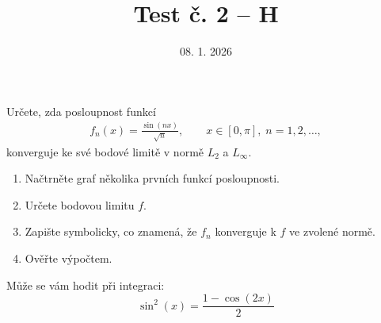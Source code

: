 \documentclass{article}
\begin{document}
\title{Test č. 2 -- H}
\date{08. 1. 2026}
\author{}
\maketitle


\noindent
Určete, zda posloupnost funkcí
\begin{align*}
        f_n(x) = \frac{\sin(nx)}{\sqrt{n}}, \qquad x\in[0,\pi],\; n=1,2,\ldots,
\end{align*}
konverguje ke své bodové limitě v normě $L_2$ a $L_\infty$.

\vspace{2cm}

\begin{enumerate}
\item Načtrněte graf několika prvních funkcí posloupnosti.
\item Určete bodovou limitu $f$.
\item Zapište symbolicky, co znamená, že $f_n$ konverguje k $f$ ve zvolené normě.
\item Ověřte výpočtem.
\end{enumerate}


\vspace{3cm}
Může se vám hodit při integraci:
\[
        \sin^2(x) = \frac{1 - \cos(2x)}{2}
\]
\end{document}
